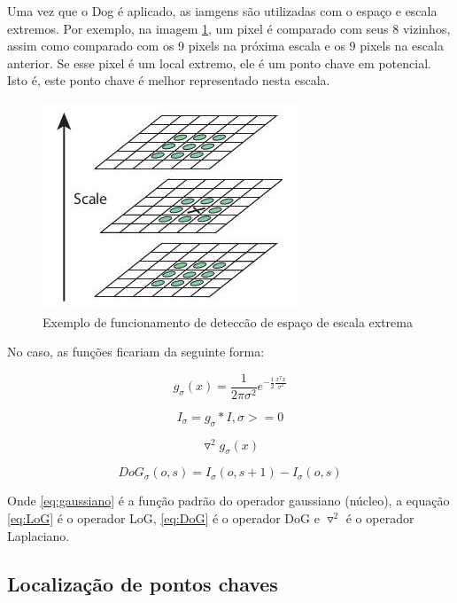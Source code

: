 Uma vez que o Dog é aplicado, as iamgens são utilizadas com o espaço e escala extremos. Por exemplo, na imagem \ref{fig:extrema}, um pixel é comparado com seus 8 vizinhos, assim como comparado com os 9 pixels na próxima escala e os 9 pixels na escala anterior. Se esse pixel é um local extremo, ele é um ponto chave em potencial. Isto é, este ponto chave é melhor representado nesta escala.

\begin{figure} [!h]
	\centering
	\includegraphics[width=0.45\linewidth]{figs/sift_local_extrema.jpg}
	\caption{%
	Exemplo de funcionamento de deteccão de espaço de escala extrema
	}\label{fig:extrema}
\end{figure}

No caso, as funções ficariam da seguinte forma: 

\begin{equation}
	g_\sigma(x) = \frac{1}{2 \pi \sigma ^2} e^{-\frac{1}{2} \frac{x^T x}{\sigma ^2}}
	\label{eq:gaussiano}
\end{equation}

\begin{equation}
	I_\sigma = g_\sigma * I, \sigma >= 0

\label{eq:gaussianScaleSpace}
\end{equation}

\begin{equation}
\triangledown^2	g_\sigma(x)
	\label{eq:LoG}
\end{equation}

\begin{equation}
	DoG_\sigma(o,s) = I_\sigma(o,s+1) - I_\sigma(o,s)
	\label{eq:DoG}
\end{equation}


Onde \ref{eq:gaussiano} é a função padrão do operador gaussiano (núcleo), a equação \ref{eq:LoG} é o operador LoG,  \ref{eq:DoG} é o operador DoG e $\triangledown^2$ é o operador Laplaciano.

\subsection{Localização de pontos chaves}

